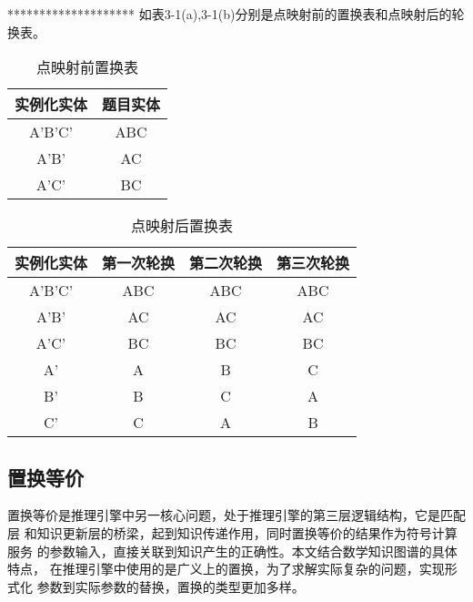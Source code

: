 \documentclass{standalone}
\begin{document}
********************
如表3-1(a),3-1(b)分别是点映射前的置换表和点映射后的轮换表。
\begin{table}[h]
	\caption{点映射前置换表} 
	\begin{tabular}{|c|c|} 
		\hline  
		实例化实体 & 题目实体\\
		\hline  
		A'B'C' & ABC  \\  
		\hline 
		A'B' & AC  \\  
		\hline 
		A'C' & BC\\  
		\hline  
	\end{tabular}
	\label{tablea}
\end{table}

\begin{table}[h]
	\caption{点映射后置换表} 
	\begin{tabular}{|c|c|c|c|} 
		\hline  
		实例化实体 & 第一次轮换 & 第二次轮换 & 第三次轮换\\
		\hline  
		A'B'C' & ABC  & ABC & ABC\\  
		\hline 
		A'B' & AC  & AC & AC\\  
		\hline 
		A'C' & BC & BC & BC\\    
		\hline  
		A' & A & B & C\\  
		\hline 
		B' & B & C & A\\  
		\hline 
		C' & C & A & B\\  
		\hline  
	\end{tabular}
	\label{tablea}
\end{table}
\subsection{置换等价}
置换等价是推理引擎中另一核心问题，处于推理引擎的第三层逻辑结构，它是匹配层
和知识更新层的桥梁，起到知识传递作用，同时置换等价的结果作为符号计算服务
的参数输入，直接关联到知识产生的正确性。本文结合数学知识图谱的具体特点，
在推理引擎中使用的是广义上的置换，为了求解实际复杂的问题，实现形式化
参数到实际参数的替换，置换的类型更加多样。
\end{document}
